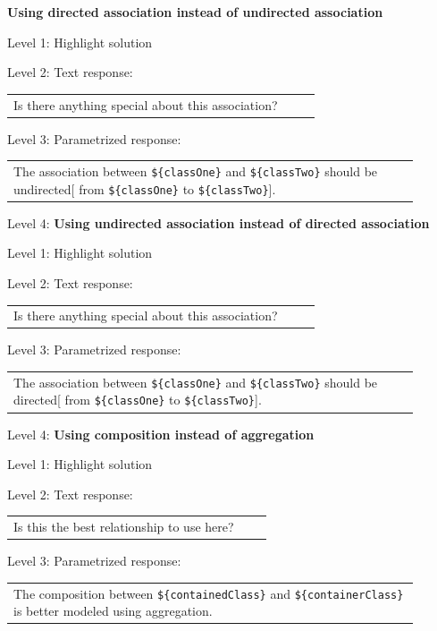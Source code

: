 \noindent \textbf{Using directed association instead of undirected association} \medskip

\noindent Level 1: Highlight solution \medskip

\noindent Level 2: Text response: \medskip

\begin{tabular}{|p{0.9\linewidth}}
Is there anything special about this association?
\end{tabular} \medskip

\noindent Level 3: Parametrized response: \medskip

\begin{tabular}{|p{0.9\linewidth}}
The association between \verb|${classOne}| and \verb|${classTwo}| should be undirected[ from \verb|${classOne}| to \verb|${classTwo}|].
\end{tabular} \medskip

\noindent Level 4: 
\noindent \textbf{Using undirected association instead of directed association} \medskip

\noindent Level 1: Highlight solution \medskip

\noindent Level 2: Text response: \medskip

\begin{tabular}{|p{0.9\linewidth}}
Is there anything special about this association?
\end{tabular} \medskip

\noindent Level 3: Parametrized response: \medskip

\begin{tabular}{|p{0.9\linewidth}}
The association between \verb|${classOne}| and \verb|${classTwo}| should be directed[ from \verb|${classOne}| to \verb|${classTwo}|].
\end{tabular} \medskip

\noindent Level 4: 
\noindent \textbf{Using composition instead of aggregation} \medskip

\noindent Level 1: Highlight solution \medskip

\noindent Level 2: Text response: \medskip

\begin{tabular}{|p{0.9\linewidth}}
Is this the best relationship to use here?
\end{tabular} \medskip

\noindent Level 3: Parametrized response: \medskip

\begin{tabular}{|p{0.9\linewidth}}
The composition between \verb|${containedClass}| and \verb|${containerClass}| is better modeled using aggregation.
\end{tabular} \medskip

